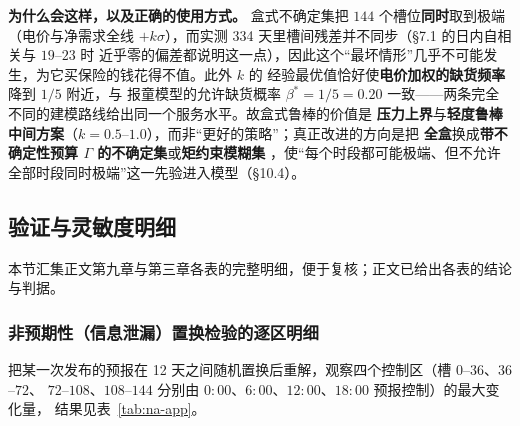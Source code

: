 \textbf{为什么会这样，以及正确的使用方式。} 盒式不确定集把 $144$ 个槽位\textbf{同时}取到极端
（电价与净需求全线 $+k\sigma$），而实测 334 天里槽间残差并不同步（\S7.1 的日内自相关与 $19$--$23$ 时
近乎零的偏差都说明这一点），因此这个“最坏情形”几乎不可能发生，为它买保险的钱花得不值。此外 $k$ 的
经验最优值恰好使\textbf{电价加权的缺货频率}降到 $1/5$ 附近，与  报童模型的允许缺货概率
$\beta^{*}=1/5=0.20$ 一致——两条完全不同的建模路线给出同一个服务水平。故盒式鲁棒的价值是
\textbf{压力上界}与\textbf{轻度鲁棒中间方案}（$k=0.5$--$1.0$），而非“更好的策略”；真正改进的方向是把
\textbf{全盒}换成\textbf{带不确定性预算 $\Gamma$ 的不确定集}或\textbf{矩约束模糊集}
\cite{refyuhaodong}，使“每个时段都可能极端、但不允许全部时段同时极端”这一先验进入模型（\S10.4）。

\subsection{验证与灵敏度明细}

本节汇集正文第九章与第三章各表的完整明细，便于复核；正文已给出各表的结论与判据。

\subsubsection{非预期性（信息泄漏）置换检验的逐区明细}\label{sec:na-app}

把某一次发布的预报在 12 天之间随机置换后重解，观察四个控制区（槽 $0$--$36$、$36$--$72$、
$72$--$108$、$108$--$144$ 分别由 $0{:}00$、$6{:}00$、$12{:}00$、$18{:}00$ 预报控制）的最大变化量，
结果见表~\ref{tab:na-app}。

